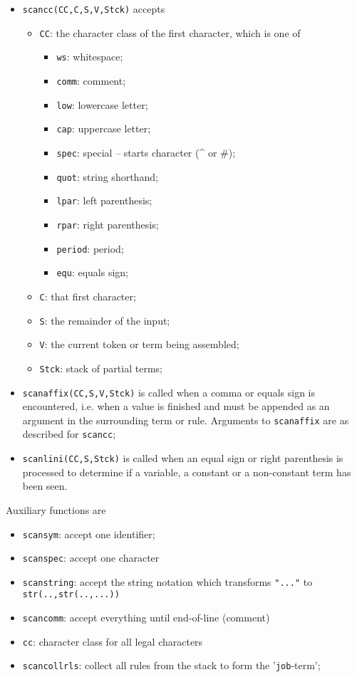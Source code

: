 \documentclass[11pt,twoside]{memoir}
\def\T{\texttt}
\begin{document}
\begin{itemize}
	\item \T{scancc(CC,C,S,V,Stck)} accepts
	\begin{itemize}
		\item \T{CC}: the character class of the first character, which is one of
		\begin{itemize}
			\item \T{ws}: whitespace;
			\item \T{comm}: comment;
			\item \T{low}: lowercase letter;
			\item \T{cap}: uppercase letter;
			\item \T{spec}: special -- starts character (\^{} or \#);
			\item \T{quot}: string shorthand;
			\item \T{lpar}: left parenthesis;
			\item \T{rpar}: right parenthesis;
			\item \T{period}: period;
			\item \T{equ}: equals sign;			
		\end{itemize}
		\item \T{C}: that first character;
		\item \T{S}: the remainder of the input;
		\item \T{V}: the current token or term being assembled;
		\item \T{Stck}: stack of partial terms;
	\end{itemize}
	\item \T{scanaffix(CC,S,V,Stck)} is called when a comma or equals sign is encountered, i.e. when a value is finished and must be appended as an argument in the surrounding term or rule. Arguments to \T{scanaffix} are as described for \T{scancc};
	\item \T{scanlini(CC,S,Stck)} is called when an equal sign or right parenthesis is processed to determine if a variable, a constant or a non-constant term has been seen.
\end{itemize}

\noindent
Auxiliary functions are
\begin{itemize}
	\item \T{scansym}: accept one identifier;
	\item \T{scanspec}: accept one character
	\item \T{scanstring}: accept the string notation which transforms \T{"..."} to \T{str(..,str(..,...))}
	\item \T{scancomm}: accept everything until end-of-line (comment)
	\item \T{cc}: character class for all legal characters
	\item \T{scancollrls}: collect all rules from the stack to form the '\T{job}-term';
\end{itemize}
\end{document}
